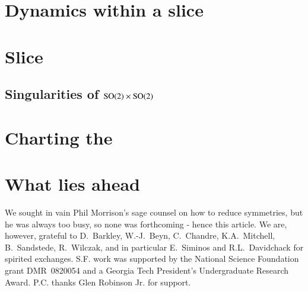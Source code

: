 \documentclass[final,3p,times]{elsarticle}	%
\begin{document}
\section{\Mframes}
    \label{sec:frame}
    

\section{Dynamics within a slice}
    \label{sec:mslices}
    

\section{Slice {\sset}}
	\label{sec:singul}
    
\subsection{Singularities of $\textrm{SO}(2) \times \textrm{SO}(2)$}
	\label{sec:singulProd}
    

\section{Charting the \reducedsp}
	\label{sec:chart}
    

\section{What lies ahead} %
    \label{sec:concl}
    

	\medskip
We sought in vain Phil Morrison's sage counsel on how
to reduce symmetries, but he was always too busy,
so none was forthcoming - hence this article.
We are, however, grateful to
D.~Barkley,
W.-J.~Beyn,
C.~Chandre,
K.A.~Mitchell,
B.~Sandstede,
R.~Wilczak,
and in particular E.~Siminos and R.L.~Davidchack
for spirited exchanges.
S.F. work was supported by the National Science Foundation
grant DMR~0820054 and a Georgia Tech President's Undergraduate
Research Award.
P.C. thanks Glen Robinson Jr. for support. 	




\ifboyscout
\newpage
\fi
\PublicPrivate{}{
    
	} %
\end{document}
